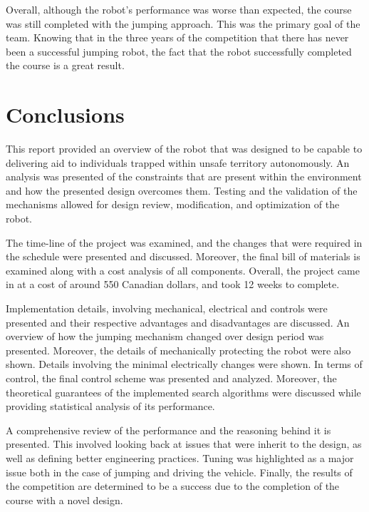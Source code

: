 \documentclass[ece]{uw-wkrpt}
\let\oldsection\section
\renewcommand\section{\clearpage\oldsection}
\begin{document}
Overall, although the robot’s performance was worse than expected, the course was still completed with the jumping approach. This was the primary goal of the team. Knowing that in the three years of the competition that there has never been a successful jumping robot, the fact that the robot successfully completed the course is a great result. 

\section{Conclusions}

This report provided an overview of the robot that was designed to be capable to delivering aid to individuals trapped within unsafe territory autonomously. An analysis was presented of the constraints that are present within the environment and how the presented design overcomes them. Testing and the validation of the mechanisms allowed for design review, modification, and optimization of the robot. 

The time-line of the project was examined, and the changes that were required in the schedule were presented and discussed. Moreover, the final bill of materials is examined along with a cost analysis of all components. Overall, the project came in at a cost of around 550 Canadian dollars, and took 12 weeks to complete. 

Implementation details, involving mechanical, electrical and controls were presented and their respective advantages and disadvantages are discussed. An overview of how the jumping mechanism changed over design period was presented. Moreover, the details of mechanically protecting the robot were also shown. Details involving the minimal electrically changes were shown. In terms of control, the final control scheme was presented and analyzed. Moreover, the theoretical guarantees of the implemented search algorithms were discussed while providing statistical analysis of its performance. 

A comprehensive review of the performance and the reasoning behind it is presented. This involved looking back at issues that were inherit to the design, as well as defining better engineering practices. Tuning was highlighted as a major issue both in the case of jumping and driving the vehicle. Finally, the results of the competition are determined to be a success due to the completion of the course with a novel design. 

\end{document}
